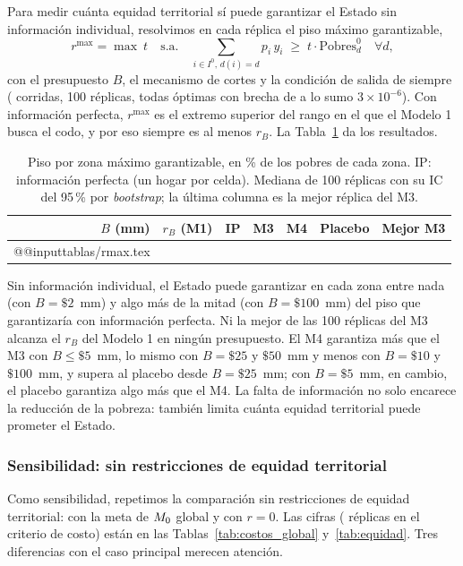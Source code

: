 Para medir cuánta equidad territorial sí puede garantizar el Estado sin
información individual, resolvimos en cada réplica el piso máximo garantizable,
\[
r^{\max}=\max\ t\quad\text{s.a.}\quad
\sum_{i\in I^0,\,d(i)=d} p_i\,y_i\;\ge\;t\cdot\text{Pobres}_d^0
\quad\forall d,
\]
con el presupuesto $B$, el mecanismo de cortes y la condición de salida de
siempre (\zCorridasRmax{} corridas, 100 réplicas, todas óptimas con brecha de a lo sumo $3\times10^{-6}$). Con información
perfecta, $r^{\max}$ es el extremo superior del rango en el que el Modelo 1 busca
el codo, y por eso siempre es al menos $r_B$. La Tabla~\ref{tab:rmax} da los
resultados.

\begin{table}[ht]
\centering\footnotesize
\caption{Piso por zona máximo garantizable, en \% de los pobres de cada zona.
IP: información perfecta (un hogar por celda). Mediana de 100 réplicas con su
IC del 95\,\% por \emph{bootstrap}; la última columna es la mejor réplica del M3.}
\label{tab:rmax}
\begin{tabular}{@{}rrrccrr@{}}
\toprule
$B$ (mm) & $r_B$ (M1) & IP & M3 & M4 & Placebo & Mejor M3 \\
\midrule
\csname @@input\endcsname tablas/rmax.tex
\bottomrule
\end{tabular}
\end{table}

Sin información individual, el Estado puede garantizar en cada zona entre nada
(con $B=\$2$~mm) y algo más de la mitad (con $B=\$100$~mm) del piso que
garantizaría con información perfecta. Ni la mejor de las 100 réplicas del M3
alcanza el $r_B$ del Modelo 1 en ningún presupuesto. El M4 garantiza más que el
M3 con $B\le\$5$~mm, lo mismo con $B=\$25$ y $\$50$~mm y menos con $B=\$10$ y $\$100$~mm, y supera al placebo desde
$B=\$25$~mm; con $B=\$5$~mm, en cambio, el placebo garantiza algo más que el M4. La falta de información no solo encarece la reducción de la
pobreza: también limita cuánta equidad territorial puede prometer el Estado.

\subsubsection{Sensibilidad: sin restricciones de equidad territorial}

Como sensibilidad, repetimos la comparación sin restricciones de equidad
territorial: con la meta de $M_0$ global y con $r=0$. Las cifras
(\cReplicasCosto{} réplicas en el criterio de costo) están en las
Tablas~\ref{tab:costos_global} y~\ref{tab:equidad}. Tres diferencias con el caso
principal merecen atención.

